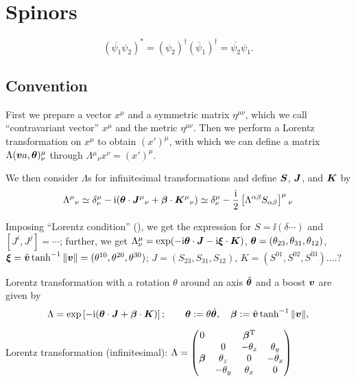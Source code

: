\documentclass[CheatSheet]{subfiles}
\begin{document}
\changefontsizes{10pt}
\section{Spinors}

\changefontsizes{9pt}
\begin{equation}
 (\overline{\psi_1}\psi_2)^* = (\psi_2)^\dagger(\overline\psi_1)^\dagger = \overline{\psi_2}\psi_1.
\end{equation}


\subsection{Convention }
First we prepare a vector $x^\mu$ and a symmetric matrix $\eta^{\mu\nu}$, which we call ``contravariant vector'' $x^\mu$ and the metric $\eta^{\mu\nu}$.
Then we perform a Lorentz transformation on $x^\mu$ to obtain $(x')^\mu$, with which we can define a matrix $\Lambda({\bm{v}}a,{\bm{\theta}})^{\mu}_{\nu}$ through 
$\Lambda{}^\mu{}_\nu x^{\nu}=(x')^{\mu}$.

We then consider $\Lambda$s for infinitesimal transformations and define ${\bm{S}}$, ${\bm{J}}$, and ${\bm{K}}$ by
\begin{align}
 \Lambda^\mu{}_\nu
  \simeq \delta^\mu_\nu-\mathrm{i}({\bm{\theta}}\cdot{\bm{J}}^\mu{}_\nu+{\bm{\beta}}\cdot{\bm{K}}^\mu{}_\nu)
  \simeq \delta^\mu_\nu-\frac{\mathrm{i}}{2}  \left[\Lambda^{\alpha\beta}S_{\alpha\beta}\right]^\mu{}_\nu
\end{align}

Imposing ``Lorentz condition'' (), we get the expression for $S=\ii(\delta\cdots)$ and $[J^i,J^j]=\cdots$; further, we get $\Lambda^{\mu}_{\nu}=\exp(-\mathrm{i}{\bm{\theta}}\cdot{\bm{J}} -\mathrm{i} {\bm{\xi}}\cdot{\bm{K}})$, ${\bm{\theta}}=(\theta_{23},\theta_{31}, \theta_{12})$, ${\bm{\xi}} = \hat{{\bm{v}}}\tanh^{-1}\|{\bm{v}}\|=(\theta^{10},\theta^{20},\theta^{30})$; $J=(S_{23},S_{31},S_{12})$, $K=(S^{01}, S^{02}, S^{03})$....?




Lorentz transformation with a rotation $\theta$ around an axis $\hat{{\bm{\theta}}}$ and a boost ${\bm{v}}$ are given by
\begin{equation}
 \Lambda = \exp\left[-\mathrm{i}({\bm{\theta}}\cdot{\bm{J}}+{\bm{\beta}}\cdot {\bm{K}})\right];
\qquad
{\bm{\theta}}:=\theta\hat{{\bm{\theta}}}, \quad {\bm{\beta}} := \hat{{\bm{v}}}\tanh^{-1}\|{\bm{v}}\|,
\end{equation}


Lorentz transformation (infinitesimal):
$\Lambda=\begin{pmatrix}
  0 &   & {\bm{\beta}}^{\mathrm{T}} & \\
    & 0 &-\theta_z & \theta_y\\
  {\bm{\beta}} & \theta_z & 0 & -\theta_x \\
   & -\theta_y & \theta_x & 0
\end{pmatrix}$
\end{document}
